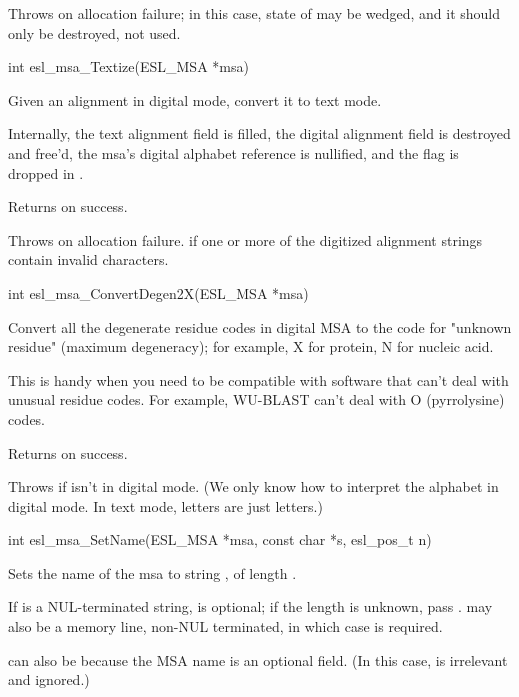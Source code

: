 \begin{sreapi}
Throws  on allocation failure; in this case, state of  may be 
wedged, and it should only be destroyed, not used.


\hypertarget{func:esl_msa_Textize()}
{\item[int esl\_msa\_Textize(ESL\_MSA *msa)]}

Given an alignment  in digital mode, convert it
to text mode.

Internally, the  text alignment field is filled, the
 digital alignment field is destroyed and free'd, the
msa's  digital alphabet reference is nullified, and 
the  flag is dropped in .

Returns  on success.

Throws  on allocation failure.
 if one or more of the digitized alignment strings
contain invalid characters.


\hypertarget{func:esl_msa_ConvertDegen2X()}
{\item[int esl\_msa\_ConvertDegen2X(ESL\_MSA *msa)]}

Convert all the degenerate residue codes in digital
MSA  to the code for "unknown residue" (maximum
degeneracy); for example, X for protein, N for 
nucleic acid. 

This is handy when you need to be compatible with
software that can't deal with unusual residue codes.
For example, WU-BLAST can't deal with O (pyrrolysine)
codes. 

Returns  on success.

Throws  if  isn't in digital mode. 
(We only know how to interpret the alphabet in digital
mode. In text mode, letters are just letters.)


\hypertarget{func:esl_msa_SetName()}
{\item[int esl\_msa\_SetName(ESL\_MSA *msa, const char *s, esl\_pos\_t n)]}

Sets the name of the msa  to string ,
of length . 

If  is a NUL-terminated string,  is optional; if
the length is unknown, pass .  may also be a
memory line, non-NUL terminated, in which case  is
required.

 can also be  because the MSA name is an
optional field. (In this case,  is irrelevant and
ignored.)


\end{sreapi}
